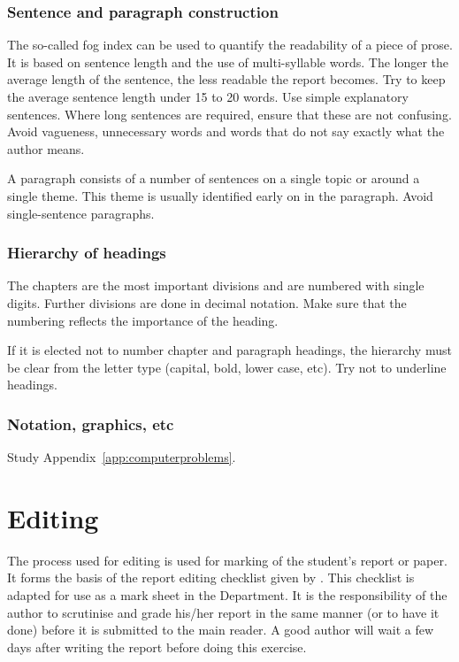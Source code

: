\documentclass[a5paper, 10pt]{article}
\begin{document}
\subsubsection{Sentence and paragraph construction}
The so-called fog index can be used to quantify the readability of a
piece of prose.  It is based on sentence length and the use of
multi-syllable words.  The longer the average length of the sentence,
the less readable the report becomes.  Try to keep the average
sentence length under 15 to 20 words.  Use simple explanatory
sentences.  Where long sentences are required, ensure that these are
not confusing.  Avoid vagueness, unnecessary words and words that do
not say exactly what the author means.

A paragraph consists of a number of sentences on a single topic or around a single theme.  
This theme is usually identified early on in the paragraph.
Avoid single-sentence paragraphs.

\subsubsection{Hierarchy of headings}
\label{sec:hierarchy-headings}
The chapters are the most important divisions and are numbered with
single digits.  Further divisions are done in decimal notation.  Make
sure that the numbering reflects the importance of the heading.

If it is elected not to number chapter and paragraph headings, the
hierarchy must be clear from the letter type (capital, bold, lower
case, etc).  Try not to underline headings.

\subsubsection{Notation, graphics, etc}
Study Appendix~\ref{app:computerproblems}.

\section{Editing}
\label{cha:editing}
The process used for editing is used for marking of the student's
report or paper.  It forms the basis of the report editing checklist
given by \citet[176]{bruckmanmandersloot}.  This checklist is adapted
for use as a mark sheet in the Department.  It is the responsibility
of the author to scrutinise and grade his/her report in the same
manner (or to have it done) before it is submitted to the main reader.
A good author will wait a few days after writing the report before
doing this exercise.
\end{document}
